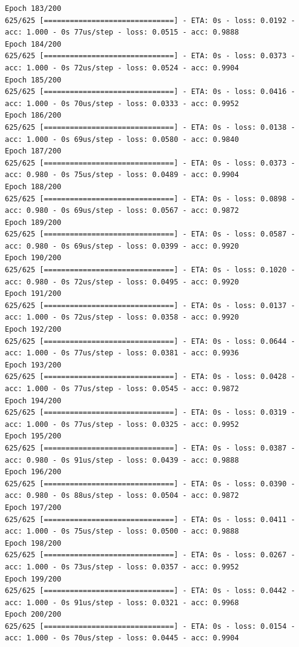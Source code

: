 \documentclass[11pt]{article}
\begin{document}
\begin{Verbatim}[commandchars=\\\{\}]
Epoch 183/200
625/625 [==============================] - ETA: 0s - loss: 0.0192 - acc: 1.000 - 0s 77us/step - loss: 0.0515 - acc: 0.9888
Epoch 184/200
625/625 [==============================] - ETA: 0s - loss: 0.0373 - acc: 1.000 - 0s 72us/step - loss: 0.0524 - acc: 0.9904
Epoch 185/200
625/625 [==============================] - ETA: 0s - loss: 0.0416 - acc: 1.000 - 0s 70us/step - loss: 0.0333 - acc: 0.9952
Epoch 186/200
625/625 [==============================] - ETA: 0s - loss: 0.0138 - acc: 1.000 - 0s 69us/step - loss: 0.0580 - acc: 0.9840
Epoch 187/200
625/625 [==============================] - ETA: 0s - loss: 0.0373 - acc: 0.980 - 0s 75us/step - loss: 0.0489 - acc: 0.9904
Epoch 188/200
625/625 [==============================] - ETA: 0s - loss: 0.0898 - acc: 0.980 - 0s 69us/step - loss: 0.0567 - acc: 0.9872
Epoch 189/200
625/625 [==============================] - ETA: 0s - loss: 0.0587 - acc: 0.980 - 0s 69us/step - loss: 0.0399 - acc: 0.9920
Epoch 190/200
625/625 [==============================] - ETA: 0s - loss: 0.1020 - acc: 0.980 - 0s 72us/step - loss: 0.0495 - acc: 0.9920
Epoch 191/200
625/625 [==============================] - ETA: 0s - loss: 0.0137 - acc: 1.000 - 0s 72us/step - loss: 0.0358 - acc: 0.9920
Epoch 192/200
625/625 [==============================] - ETA: 0s - loss: 0.0644 - acc: 1.000 - 0s 77us/step - loss: 0.0381 - acc: 0.9936
Epoch 193/200
625/625 [==============================] - ETA: 0s - loss: 0.0428 - acc: 1.000 - 0s 77us/step - loss: 0.0545 - acc: 0.9872
Epoch 194/200
625/625 [==============================] - ETA: 0s - loss: 0.0319 - acc: 1.000 - 0s 77us/step - loss: 0.0325 - acc: 0.9952
Epoch 195/200
625/625 [==============================] - ETA: 0s - loss: 0.0387 - acc: 0.980 - 0s 91us/step - loss: 0.0439 - acc: 0.9888
Epoch 196/200
625/625 [==============================] - ETA: 0s - loss: 0.0390 - acc: 0.980 - 0s 88us/step - loss: 0.0504 - acc: 0.9872
Epoch 197/200
625/625 [==============================] - ETA: 0s - loss: 0.0411 - acc: 1.000 - 0s 75us/step - loss: 0.0500 - acc: 0.9888
Epoch 198/200
625/625 [==============================] - ETA: 0s - loss: 0.0267 - acc: 1.000 - 0s 73us/step - loss: 0.0357 - acc: 0.9952
Epoch 199/200
625/625 [==============================] - ETA: 0s - loss: 0.0442 - acc: 1.000 - 0s 91us/step - loss: 0.0321 - acc: 0.9968
Epoch 200/200
625/625 [==============================] - ETA: 0s - loss: 0.0154 - acc: 1.000 - 0s 70us/step - loss: 0.0445 - acc: 0.9904

    \end{Verbatim}
\end{document}
